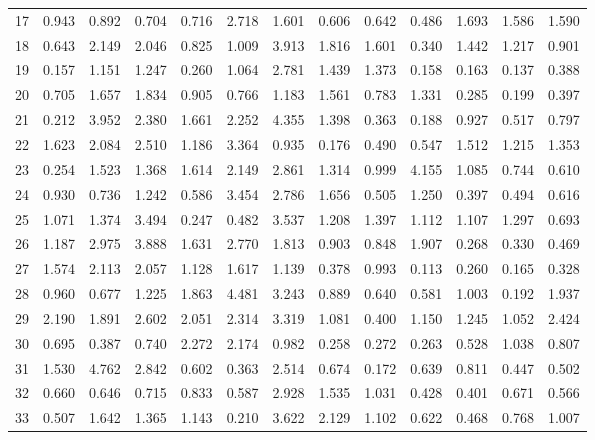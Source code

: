 \begin{tabular}{lrrrrrrrrrrrr}
17  &  0.943 &  0.892 &  0.704 &  0.716 &  2.718 &  1.601 &  0.606 &  0.642 &  0.486 &  1.693 &  1.586 &  1.590 \\
18  &  0.643 &  2.149 &  2.046 &  0.825 &  1.009 &  3.913 &  1.816 &  1.601 &  0.340 &  1.442 &  1.217 &  0.901 \\
19  &  0.157 &  1.151 &  1.247 &  0.260 &  1.064 &  2.781 &  1.439 &  1.373 &  0.158 &  0.163 &  0.137 &  0.388 \\
20  &  0.705 &  1.657 &  1.834 &  0.905 &  0.766 &  1.183 &  1.561 &  0.783 &  1.331 &  0.285 &  0.199 &  0.397 \\
21  &  0.212 &  3.952 &  2.380 &  1.661 &  2.252 &  4.355 &  1.398 &  0.363 &  0.188 &  0.927 &  0.517 &  0.797 \\
22  &  1.623 &  2.084 &  2.510 &  1.186 &  3.364 &  0.935 &  0.176 &  0.490 &  0.547 &  1.512 &  1.215 &  1.353 \\
23  &  0.254 &  1.523 &  1.368 &  1.614 &  2.149 &  2.861 &  1.314 &  0.999 &  4.155 &  1.085 &  0.744 &  0.610 \\
24  &  0.930 &  0.736 &  1.242 &  0.586 &  3.454 &  2.786 &  1.656 &  0.505 &  1.250 &  0.397 &  0.494 &  0.616 \\
25  &  1.071 &  1.374 &  3.494 &  0.247 &  0.482 &  3.537 &  1.208 &  1.397 &  1.112 &  1.107 &  1.297 &  0.693 \\
26  &  1.187 &  2.975 &  3.888 &  1.631 &  2.770 &  1.813 &  0.903 &  0.848 &  1.907 &  0.268 &  0.330 &  0.469 \\
27  &  1.574 &  2.113 &  2.057 &  1.128 &  1.617 &  1.139 &  0.378 &  0.993 &  0.113 &  0.260 &  0.165 &  0.328 \\
28  &  0.960 &  0.677 &  1.225 &  1.863 &  4.481 &  3.243 &  0.889 &  0.640 &  0.581 &  1.003 &  0.192 &  1.937 \\
29  &  2.190 &  1.891 &  2.602 &  2.051 &  2.314 &  3.319 &  1.081 &  0.400 &  1.150 &  1.245 &  1.052 &  2.424 \\
30  &  0.695 &  0.387 &  0.740 &  2.272 &  2.174 &  0.982 &  0.258 &  0.272 &  0.263 &  0.528 &  1.038 &  0.807 \\
31  &  1.530 &  4.762 &  2.842 &  0.602 &  0.363 &  2.514 &  0.674 &  0.172 &  0.639 &  0.811 &  0.447 &  0.502 \\
32  &  0.660 &  0.646 &  0.715 &  0.833 &  0.587 &  2.928 &  1.535 &  1.031 &  0.428 &  0.401 &  0.671 &  0.566 \\
33  &  0.507 &  1.642 &  1.365 &  1.143 &  0.210 &  3.622 &  2.129 &  1.102 &  0.622 &  0.468 &  0.768 &  1.007 \\

\end{tabular}
